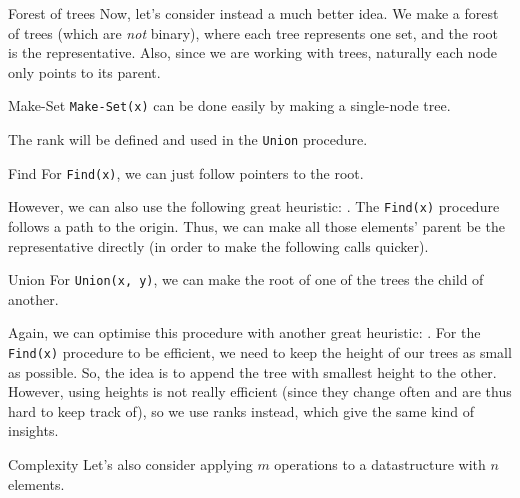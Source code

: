 \documentclass[a4paper]{article}
\begin{document}
\begin{parag}{Forest of trees}
    Now, let's consider instead a much better idea. We make a forest of trees (which are \textit{not} binary), where each tree represents one set, and the root is the representative. Also, since we are working with trees, naturally each node only points to its parent.

   
    \begin{subparag}{Make-Set}
        \texttt{Make-Set(x)} can be done easily by making a single-node tree.  


        The rank will be defined and used in the \texttt{Union} procedure.
    \end{subparag}

    \begin{subparag}{Find}
        For \texttt{Find(x)}, we can just follow pointers to the root.
        
        However, we can also use the following great heuristic: . The \texttt{Find(x)} procedure follows a path to the origin. Thus, we can make all those elements' parent be the representative directly (in order to make the following calls quicker).

    \end{subparag}
    
    \begin{subparag}{Union}
        For \texttt{Union(x, y)}, we can make the root of one of the trees the child of another.

        Again, we can optimise this procedure with another great heuristic: . For the \texttt{Find(x)} procedure to be efficient, we need to keep the height of our trees as small as possible. So, the idea is to append the tree with smallest height to the other. However, using heights is not really efficient (since they change often and are thus hard to keep track of), so we use ranks instead, which give the same kind of insights.

    \end{subparag}
    
    \begin{subparag}{Complexity}
        Let's also consider applying $m$ operations to a datastructure with $n$ elements.


\end{subparag}
\end{parag}
\end{document}
